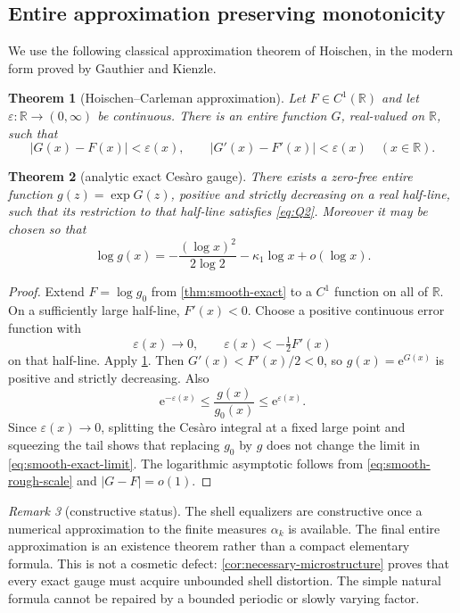\documentclass[11pt,oneside]{article}
\newtheorem{theorem}{Theorem}[section]
\theoremstyle{definition}
\theoremstyle{remark}
\newtheorem{remark}[theorem]{Remark}
\newcommand{\R}{\mathbb R}
\newcommand{\e}{\mathrm e}
\begin{document}
\subsection{Entire approximation preserving monotonicity}

We use the following classical approximation theorem of Hoischen, in the
modern form proved by Gauthier and Kienzle.

\begin{theorem}[Hoischen--Carleman approximation]
\label{thm:Hoischen}
Let \(F\in C^1(\R)\) and let \(\varepsilon:\R\to(0,\infty)\) be continuous.
There is an entire function \(G\), real-valued on \(\R\), such that
\begin{equation}
 |G(x)-F(x)|<\varepsilon(x),
 \qquad
 |G'(x)-F'(x)|<\varepsilon(x)
 \quad(x\in\R).
 \label{eq:Hoischen}
\end{equation}
\end{theorem}

\begin{theorem}[analytic exact Ces\`aro gauge]
\label{thm:analytic-exact}
There exists a zero-free entire function \(g(z)=\exp G(z)\), positive and
strictly decreasing on a real half-line, such that its restriction to that
half-line satisfies \eqref{eq:Q2}.  Moreover it may be chosen so that
\begin{equation}
 \log g(x)
 =-\frac{(\log x)^2}{2\log2}-\kappa_1\log x+o(\log x).
 \label{eq:analytic-rough-scale}
\end{equation}
\end{theorem}

\begin{proof}
Extend \(F=\log g_0\) from \cref{thm:smooth-exact} to a \(C^1\) function on
all of \(\R\).  On a sufficiently large half-line, \(F'(x)<0\).  Choose a
positive continuous error function with
\[
 \varepsilon(x)\longrightarrow0,
 \qquad
 \varepsilon(x)<-\tfrac12F'(x)
\]
on that half-line.  Apply \cref{thm:Hoischen}.  Then
\(G'(x)<F'(x)/2<0\), so \(g(x)=\e^{G(x)}\) is positive and strictly
decreasing.  Also
\[
 \e^{-\varepsilon(x)}
 \le\frac{g(x)}{g_0(x)}\le\e^{\varepsilon(x)}.
\]
Since \(\varepsilon(x)\to0\), splitting the Ces\`aro integral at a fixed
large point and squeezing the tail shows that replacing \(g_0\) by \(g\)
does not change the limit in \eqref{eq:smooth-exact-limit}.  The logarithmic
asymptotic follows from \eqref{eq:smooth-rough-scale} and
\(|G-F|=o(1)\).
\end{proof}

\begin{remark}[constructive status]
The shell equalizers are constructive once a numerical approximation to the
finite measures \(\alpha_k\) is available.  The final entire approximation is
an existence theorem rather than a compact elementary formula.  This is not a
cosmetic defect: \cref{cor:necessary-microstructure} proves that every exact
gauge must acquire unbounded shell distortion.  The simple natural formula
cannot be repaired by a bounded periodic or slowly varying factor.
\end{remark}
\end{document}
